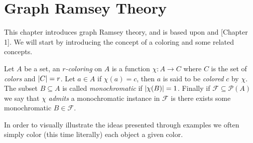 \chapter{Graph Ramsey Theory}\label{chap:graph_ramsey}
This chapter introduces graph Ramsey theory, and is based upon \cite{rt} and \cite{rtoi}[Chapter 1]. We will start by introducing the concept of a coloring and some related concepts.
\begin{definition}
	Let $A$ be a set, an \textit{$r$-coloring} on $A$ is a function $\chi: A \to C$ where $C$ is the set of \textit{colors} and $\left\lvert C\right\rvert = r$. Let $a \in A$ if $\chi(a) = c$, then $a$ is said to be \textit{colored} $c$ by $\chi$. The subset $B \subseteq A$ is called \textit{monochromatic} if $\left\lvert\chi(B)\right\rvert = 1$. Finally if $\mathcal{F} \subseteq \mathcal{P}(A)$ we say that $\chi$ \textit{admits} a monochromatic instance in $\mathcal{F}$ is there exists some monochromatic $B \in \mathcal{F}$.
\end{definition}
In order to visually illustrate the ideas presented through examples we often simply color (this time literally) each object a given color.

